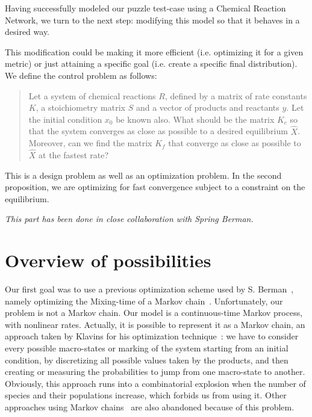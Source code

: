 Having successfully modeled our puzzle test-case using a Chemical Reaction Network, we turn to the next step: modifying this model so that
it behaves in a desired way.

This modification could be making it more efficient (i.e. optimizing it for a given metric) or just attaining a specific goal (i.e. create a specific final distribution). We define the control problem as follows:
\begin{quote}
	Let a system of chemical reactions $R$, defined by a matrix of rate constants $K$, a stoichiometry
matrix $S$ and a vector of products and reactants $y$. Let the initial condition $x_0$ be known also. What should be the matrix $K_c$ so that the system
converges as close as possible to a desired equilibrium $\hat{X}$. Moreover, can we find the matrix $K_{f}$ that converge as close as possible to $\hat{X}$ at
the fastest rate?
\end{quote}

This is a design problem as well as an optimization problem. In the second proposition, we are optimizing for fast convergence subject to a constraint on the equilibrium.

\textit{This part has been done in close collaboration with Spring Berman.}

\section{Overview of possibilities} %

	Our first goal was to use a previous optimization scheme used by S. Berman~\cite{ref:BermanTRO08, Halasz:2007p10106}, namely optimizing the Mixing-time of a Markov chain~\cite{Randall:2006p11793, NEthier:1986p4833, Sun:2005p4975}. Unfortunately, our problem is not a Markov chain. Our model is a continuous-time Markov process, with nonlinear rates. Actually, it is possible to represent it as a Markov chain, an approach taken by Klavins for his optimization technique~\cite{Klavins:2007p2600}: we have to consider every possible macro-states or marking of the system starting from an initial condition, by discretizing all possible values taken by the products, and then creating or measuring the probabilities to jump from one macro-state to another. Obviously, this approach runs into a combinatorial explosion when the number of species and their populations increase, which forbids us from using it. Other approaches using Markov chains~\cite{Runolfsson:2007p9740, Tierney:1994p9783} are also abandoned because of this problem.
	
